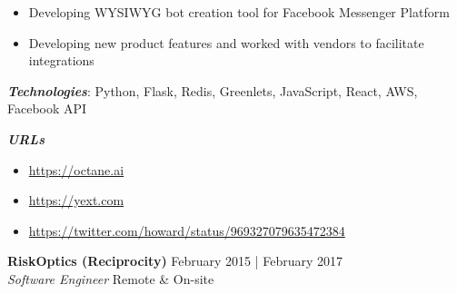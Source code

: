 \documentclass[a4paper]{article}
\newenvironment{jobdetails}%
    {\list{}{\leftmargin=4mm}\item[]}%
    {\endlist}
\begin{document}
\begin{jobdetails}
\begin{itemize}
    \item Developing WYSIWYG bot creation tool for Facebook Messenger Platform
    \item Developing new product features and worked with vendors to facilitate integrations
\end{itemize}

\vspace{2mm}

\textbf{\textit{Technologies}}: Python, Flask, Redis, Greenlets, JavaScript, React, AWS, Facebook API

\textbf{\textit{URLs}}
\begin{itemize} \itemsep 1pt
	\item \url{https://octane.ai}
    \item \url{https://yext.com}
    \item \url{https://twitter.com/howard/status/969327079635472384}
\end{itemize}

\end{jobdetails}
\vspace{1mm}




\textbf{RiskOptics (Reciprocity)} \hfill February 2015 | February 2017 \\
\textit{Software Engineer} \hfill Remote \& On-site \\
\vspace{2mm}
\end{document}

